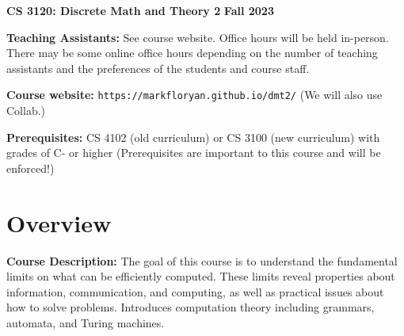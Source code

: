 \documentclass[12pt]{article}
\begin{document}
\textbf{\Large CS 3120: Discrete Math and Theory 2} \hfill \textbf{\Large Fall 2023}

\vskip 0.5in 


\vskip 0.1in
\textbf{Teaching Assistants:} See course website.  Office hours will be held in-person. There may be some online office hours depending on the number of teaching assistants and the preferences of the students and course staff.

\vskip 0.1in
\textbf{Course website:} {\tt https://markfloryan.github.io/dmt2/} (We will also use Collab.)

\textbf{Prerequisites:} CS 4102 (old curriculum) or CS 3100 (new curriculum) with grades of C- or higher (Prerequisites are important to this course and will be enforced!)

\section*{Overview}

\textbf{Course Description:} The goal of this course is to understand the fundamental limits on what can be efficiently computed. These limits reveal properties about information, communication, and computing, as well as practical issues about how to solve problems. Introduces computation theory including grammars, automata, and Turing machines.
\end{document}
